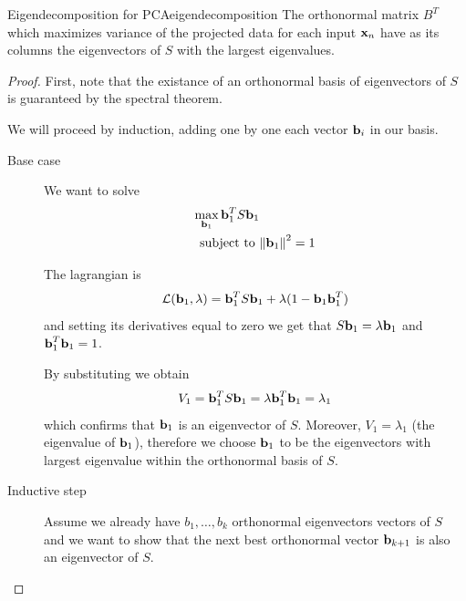 \documentclass[12pt]{extarticle}
\renewcommand{\vec}[1]{\bvec{#1}}
\begin{document}
\begin{theorem}{Eigendecomposition for PCA}{eigendecomposition}
	The orthonormal matrix $B^T$ which maximizes variance of the projected data
	for each input $\vec x_n$	have as its columns the eigenvectors of $S$
	with the largest eigenvalues.
\end{theorem}

\begin{proof}
	First, note that the existance of an orthonormal basis of eigenvectors of $S$ is guaranteed by
	the spectral theorem.

	We will proceed by induction, adding one by one each vector $\vec b_i$ in our basis.
		{
			\begin{description}
				\item[Base case]
				      We want to solve
				      \begin{align}
					      \max_{\vec b_1} \vec b_1^T S \vec b_1 &                       \\
					      \text{subject to }                    & \norm{\vec b_1}^2 = 1
				      \end{align}

				      The lagrangian is
				      \begin{equation}
					      \mathcal L(\vec b_1, \lambda) = \vec b_1^T S \vec b_1 + \lambda(1-\vec b_1 \vec b_1^T)
				      \end{equation}
				      and setting its derivatives equal to zero we get that $S \vec b_1 = \lambda \vec b_1$
				      and $\vec b_1^T \vec b_1 = 1$.

				      By substituting we obtain
				      \begin{equation}
					      V_1 = \vec b_1^T S \vec b_1 = \lambda \vec b_1^T \vec b_1 = \lambda_1
				      \end{equation}
				      which confirms that $\vec b_1$ is an eigenvector of $S$.
				      Moreover, $V_1 = \lambda_1$ (the eigenvalue of $\vec b_1$), therefore we choose
				      $\vec b_1$ to be the eigenvectors with largest eigenvalue within the orthonormal basis
				      of $S$.

				\item[Inductive step] Assume we already have $b_1, \dots, b_k$ orthonormal eigenvectors
				      vectors of $S$ and we want to show that the next best orthonormal vector
				      $\vec b_{k+1}$ is also an eigenvector of $S$.


\end{description}}
\end{proof}
\end{document}
